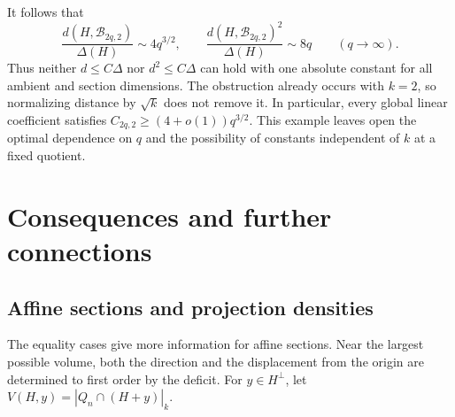 \documentclass[11pt,a4paper]{article}
\theoremstyle{remark}\newtheorem{remark}[theorem]{Remark}
\numberwithin{equation}{section}
\begin{document}
It follows that
\[
 \frac{d(H,\mathcal B_{2q,2})}{\Delta(H)}\sim4q^{3/2},\qquad
 \frac{d(H,\mathcal B_{2q,2})^2}{\Delta(H)}\sim8q
 \qquad(q\to\infty).
\]
Thus neither $d\le C\Delta$ nor $d^2\le C\Delta$ can hold with one
absolute constant for all ambient and section dimensions. The
obstruction already occurs with $k=2$, so normalizing distance by
$\sqrt{k}$ does not remove it. In particular, every global linear
coefficient satisfies $C_{2q,2}\ge(4+o(1))q^{3/2}$.
This example leaves open the optimal dependence on $q$ and the
possibility of constants independent of $k$ at a fixed quotient.

\section{Consequences and further connections}
\label{sec:consequences}

\subsection{Affine sections and projection densities}

The equality cases give more information for affine sections. Near
the largest possible volume, both the direction and the displacement
from the origin are determined to first order by the deficit.
For \(y\in H^\perp\), let \(V(H,y)=|Q_n\cap(H+y)|_k\).
\end{document}
